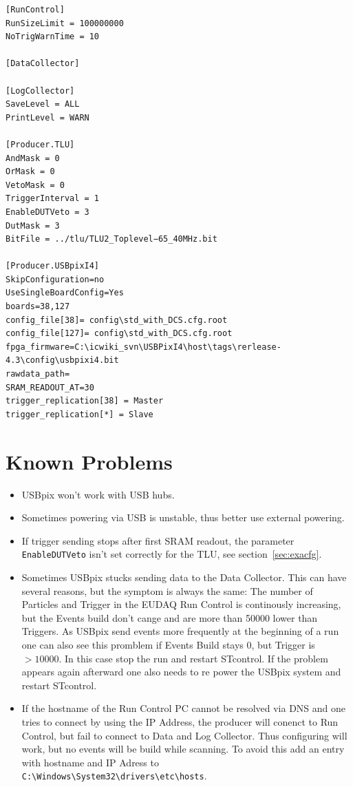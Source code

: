 \documentclass[a4paper,12pt]{article}
\begin{document}
\begin{lstlisting}
[RunControl]
RunSizeLimit = 100000000
NoTrigWarnTime = 10

[DataCollector]

[LogCollector]
SaveLevel = ALL
PrintLevel = WARN

[Producer.TLU]
AndMask = 0
OrMask = 0
VetoMask = 0
TriggerInterval = 1
EnableDUTVeto = 3
DutMask = 3
BitFile = ../tlu/TLU2_Toplevel−65_40MHz.bit

[Producer.USBpixI4]
SkipConfiguration=no
UseSingleBoardConfig=Yes
boards=38,127
config_file[38]= config\std_with_DCS.cfg.root
config_file[127]= config\std_with_DCS.cfg.root
fpga_firmware=C:\icwiki_svn\USBPixI4\host\tags\rerlease-4.3\config\usbpixi4.bit
rawdata_path=
SRAM_READOUT_AT=30
trigger_replication[38] = Master
trigger_replication[*] = Slave

\end{lstlisting}

\section{Known Problems}

\begin{itemize}
\item USBpix won't work with USB hubs.
\item Sometimes powering via USB is unstable, thus better use external powering.
\item If trigger sending stops after first SRAM readout, the parameter {\tt EnableDUTVeto}
isn't set correctly for the TLU, see section~\ref{sec:exacfg}.
\item Sometimes USBpix stucks sending data to the Data Collector. This can have
several reasons, but the symptom is always the same: The number of Particles
and Trigger in the EUDAQ Run Control is continously increasing, but the Events
build don’t cange and are more than 50000 lower than Triggers. As USBpix send
events more frequently at the beginning of a run one can also see this promblem if
Events Build stays 0, but Trigger is $> 10000$. In this case stop the run and restart
STcontrol. If the problem appears again afterward one also needs to re power the
USBpix system and restart STcontrol.
\item If the hostname of the Run Control PC cannot be resolved via DNS and one tries
to connect by using the IP Address, the producer will conenct to Run Control,
but fail to connect to Data and Log Collector. Thus configuring will work, but
no events will be build while scanning. To avoid this add an entry with hostname
and IP Adress to \\
{\tt C:\textbackslash Windows\textbackslash System32\textbackslash drivers\textbackslash etc\textbackslash hosts}.
\end{itemize}
\end{document}
